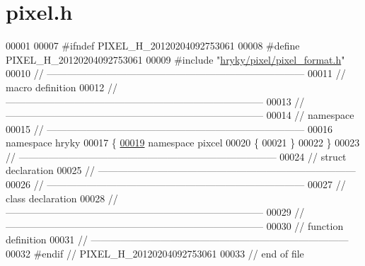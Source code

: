 \hypertarget{pixel_8h_source}{\section{pixel.\-h}
}

\begin{DoxyCode}
00001 
00007 \textcolor{preprocessor}{#ifndef PIXEL\_H\_20120204092753061}
00008 \textcolor{preprocessor}{}\textcolor{preprocessor}{#define PIXEL\_H\_20120204092753061}
00009 \textcolor{preprocessor}{}\textcolor{preprocessor}{#include "\hyperlink{pixel__format_8h}{hryky/pixel/pixel_format.h}"}
00010 \textcolor{comment}{//
      ------------------------------------------------------------------------------}
00011 \textcolor{comment}{// macro definition}
00012 \textcolor{comment}{//
      ------------------------------------------------------------------------------}
00013 \textcolor{comment}{//
      ------------------------------------------------------------------------------}
00014 \textcolor{comment}{// namespace}
00015 \textcolor{comment}{//
      ------------------------------------------------------------------------------}
00016 \textcolor{keyword}{namespace }hryky
00017 \{
\hypertarget{pixel_8h_source_l00019}{}\hyperlink{namespacehryky_1_1pixcel}{00019} \textcolor{keyword}{namespace }pixcel
00020 \{
00021 \}
00022 \}
00023 \textcolor{comment}{//
      ------------------------------------------------------------------------------}
00024 \textcolor{comment}{// struct declaration}
00025 \textcolor{comment}{//
      ------------------------------------------------------------------------------}
00026 \textcolor{comment}{//
      ------------------------------------------------------------------------------}
00027 \textcolor{comment}{// class declaration}
00028 \textcolor{comment}{//
      ------------------------------------------------------------------------------}
00029 \textcolor{comment}{//
      ------------------------------------------------------------------------------}
00030 \textcolor{comment}{// function definition}
00031 \textcolor{comment}{//
      ------------------------------------------------------------------------------}
00032 \textcolor{preprocessor}{#endif // PIXEL\_H\_20120204092753061}
00033 \textcolor{preprocessor}{}\textcolor{comment}{// end of file}
\end{DoxyCode}
